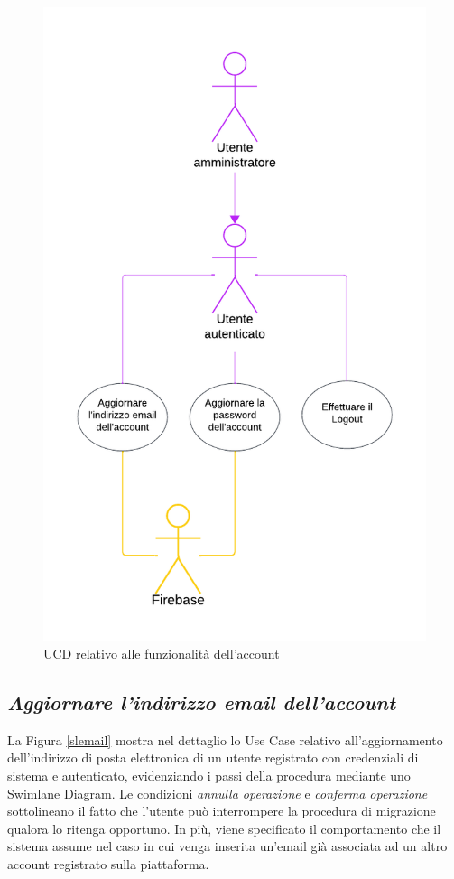 \documentclass[11pt, a4paper]{article}
\theoremstyle{definition} %
\begin{document}
\begin{figure}[H]
\centering
\includegraphics[scale = 0.88]{materiale/ucdiagrams/ucaccount.pdf}
\caption{UCD relativo alle funzionalità dell'account}
\label{accountfig}
\end{figure}



\newpage
\subsection*{\textit{Aggiornare l'indirizzo email dell'account}}
La Figura \ref{slemail} mostra nel dettaglio lo Use Case relativo all'aggiornamento
dell'indirizzo di posta elettronica di un utente registrato con credenziali di sistema
e autenticato, evidenziando i passi della procedura mediante uno Swimlane Diagram.
Le condizioni \textit{annulla operazione} e \textit{conferma operazione}
sottolineano il fatto che l'utente può interrompere la procedura di migrazione
qualora lo ritenga opportuno. In più, viene specificato il comportamento che
il sistema assume nel caso in cui venga inserita un'email già associata ad un
altro account registrato sulla piattaforma.
\end{document}
